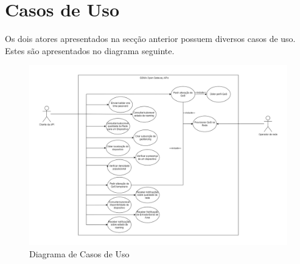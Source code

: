 \section{Casos de Uso}

Os dois atores apresentados na secção anterior possuem diversos casos de uso.
Estes são apresentados no diagrama seguinte.

\begin{figure}[H] \centerline{
		\includegraphics[width=20cm]{figs/use_case_diagram.png} } \caption{Diagrama de
		Casos de Uso} \end{figure}

